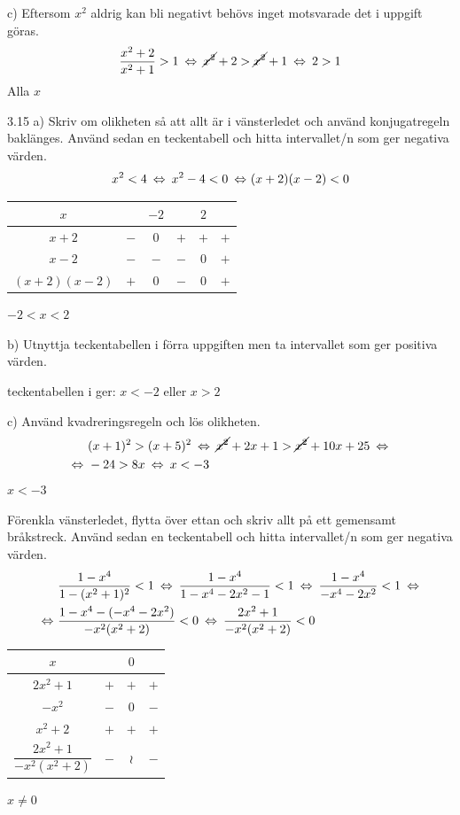 \begin{task}{c)}
	Eftersom $x^2$ aldrig kan bli negativt behövs inget motsvarade det i uppgift  göras.
	\[\dfrac{x^2+2}{x^2+1}>1 \lra
	\cancel{x^2}+2>\cancel{x^2}+1 \lra
	2>1\]
	\ans Alla $x$
\end{task}

\begin{task}{3.15 a)}
	Skriv om olikheten så att allt är i vänsterledet och använd konjugatregeln baklänges. Använd sedan en teckentabell och hitta intervallet/n som ger negativa värden.
	\[x^2<4 \lra
	x^2-4<0 \lra
	(x+2)(x-2)<0\]
	\begin{tabular}{c|c|c|c|c|c}
		$x$ & & $-2$ & & $2$ & \\ \hline
		$x+2$        & $-$ & $0$ & $+$ & $+$ & $+$ \\
		$x-2$        & $-$ & $-$ & $-$ & $0$ & $+$ \\ \hline
		$(x+2)(x-2)$ & $+$ & $0$ & $-$ & $0$ & $+$
	\end{tabular}
	
	\ans $-2<x<2$
\end{task}

\begin{task}{b)}
	Utnyttja teckentabellen i förra uppgiften men ta intervallet som ger positiva värden.
	
	\ans teckentabellen i  ger: $x<-2$ eller $x>2$
\end{task}

\begin{task}{c)}
	Använd kvadreringsregeln och lös olikheten.
	\begin{align*}
	&(x+1)^2>(x+5)^2 \lra
	\cancel{x^2}+2x+1>\cancel{x^2}+10x+25\lra \\ \lra 
	&-24>8x \lra
	x<-3
	\end{align*}
	\ans $x<-3$
\end{task}

\begin{task}{3.16}
	Förenkla vänsterledet, flytta över ettan och skriv allt på ett gemensamt bråkstreck. Använd sedan en teckentabell och hitta intervallet/n som ger negativa värden.
	\begin{align*}
	&\dfrac{1-x^4}{1-(x^2+1)^2}<1 \lra
	\dfrac{1-x^4}{1-x^4-2x^2-1}<1 \lra
	\dfrac{1-x^4}{-x^4-2x^2}<1 \lra \\ \lra 
	&\dfrac{1-x^4-(-x^4-2x^2)}{-x^2(x^2+2)}<0 \lra
	\dfrac{2x^2+1}{-x^2(x^2+2)}<0
	\end{align*}
	\begin{tabular}{c|c|c|c}
		$x$ & & $0$ & \\ \hline
		$2x^2+1$                      & $+$ & $+$ & $+$ \\
		$-x^2$                        & $-$ & $0$ & $-$ \\
		$x^2+2$                       & $+$ & $+$ & $+$ \\ \hline
		$\dfrac{2x^2+1}{-x^2(x^2+2)}$ & $-$ &$\wr$& $-$
	\end{tabular}
	
	\ans $x\neq 0$
\end{task}


